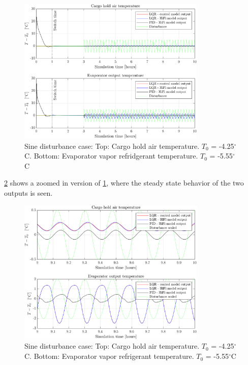 \begin{figure}[H]
	\centering
	\includegraphics[width=0.8\textwidth]{Graphics/fig_LQRvsKresten_sineDist.png}
	\caption{Sine disturbance case: Top: Cargo hold air temperature. $T_0$ = -4.25$^{\circ}$C. Bottom: Evaporator vapor refridgerant temperature. $T_0$ = -5.55$^{\circ}$C}
	\label{fig:LQR_wellTuned_sineDist}
\end{figure}

\noindent \cref{fig:LQR_wellTuned_sineDist_zoom} shows a zoomed in version of \cref{fig:LQR_wellTuned_sineDist}, where the steady state behavior of the two outputs is seen.

\begin{figure}[H]
	\centering
	\includegraphics[width=0.8\textwidth]{Graphics/fig_LQRvsKresten_sineDist_zoom.png}
	\caption{Sine disturbance case: Top: Cargo hold air temperature. $T_0$ = -4.25$^{\circ}$C. Bottom: Evaporator vapor refrigerant temperature. $T_0$ = -5.55$^{\circ}$C}
	\label{fig:LQR_wellTuned_sineDist_zoom}
\end{figure}

